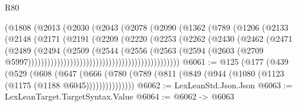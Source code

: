 \begin{lexlean}{R80}
\begin{coremodule}
                                        (@1808
                                          (@2013
                                            (@2030
                                              (@2043
                                                (@2078
                                                  (@2090
                                                    (@1362
                                                      (@789
                                                        (@1206
                                                          (@2133
                                                            (@2148
                                                              (@2171
                                                                (@2191
                                                                  (@2209
                                                                    (@2220
                                                                      (@2253
                                                                        (@2262
                                                                          (@2430
                                                                            (@2462
                                                                              (@2471
                                                                                (@2489
                                                                                  (@2494
                                                                                    (@2509
                                                                                      (@2544
                                                                                        (@2556
                                                                                          (@2563
                                                                                            (@2594
                                                                                              (@2603
                                                                                                (@2709
                                                                                                  @5997)))))))))))))))))))))))))))))))))))))))))))))))
@6061 := @125
    (@177
      (@439
        (@529
          (@608
            (@647
              (@666 (@780 (@789 (@811 (@849 (@944 (@1080 (@1123 (@1175 (@1188 @6045)))))))))))))))
@6062 := LexLeanStd.Json.Json
@6063 := LexLeanTarget.TargetSyntax.Value
@6064 := @6062 -> @6063

\end{coremodule}
\end{lexlean}

